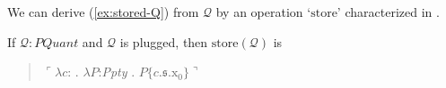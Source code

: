 We can derive (\ref{ex:stored-Q}) from $\mathcal{Q}$ by an operation
`$\mathrm{store}$' characterized in \nexteg{}.
\begin{ex}
If $\mathcal{Q}:\textit{PQuant}$ and $\mathcal{Q}$ is plugged, then
$\mathrm{store}(\mathcal{Q})$ is
\begin{quote}
  $\ulcorner\lambda c$: . $\lambda
  P$:\textit{Ppty} . $P\{c.\mathfrak{s}.\text{x}_0\}\urcorner$
\end{quote}

\end{ex} 
  


 
